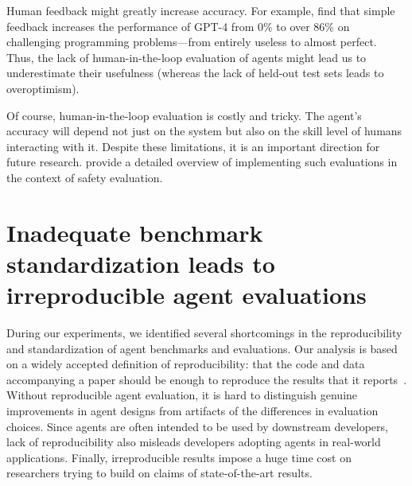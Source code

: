 \documentclass{article}
\begin{document}
Human feedback might greatly increase accuracy. For example, \citet{shi_can_2024} find that simple feedback increases the performance of GPT-4 from 0\% to over 86\% on challenging programming problems---from entirely useless to almost perfect. Thus, the lack of human-in-the-loop evaluation of agents might lead us to underestimate their usefulness (whereas the lack of held-out test sets leads to overoptimism).

Of course, human-in-the-loop evaluation is costly and tricky. The agent's accuracy will depend not just on the system but also on the skill level of humans interacting with it. Despite these limitations, it is an important direction for future research. \citet{ibrahim_beyond_2024} provide a detailed overview of implementing such evaluations in the context of safety evaluation.
























    














\section{Inadequate benchmark standardization leads to irreproducible agent evaluations}\label{sec:reproducibility} 

During our experiments, we identified several shortcomings in the reproducibility and standardization of agent benchmarks and evaluations. Our analysis is based on a widely accepted definition of reproducibility: that the code and data accompanying a paper should be enough to reproduce the results that it reports~\citep{national_academies_of_sciences_engineering_and_medicine_reproducibility_2019}. Without reproducible agent evaluation, it is hard to distinguish genuine improvements in agent designs from artifacts of the  differences in evaluation choices. Since agents are often intended to be used by downstream developers, lack of reproducibility also misleads developers adopting agents in real-world applications. Finally, irreproducible results impose a huge time cost on researchers trying to build on claims of state-of-the-art results. 
\end{document}
